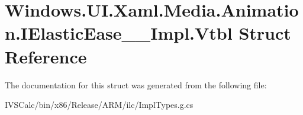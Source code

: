\hypertarget{struct_windows_1_1_u_i_1_1_xaml_1_1_media_1_1_animation_1_1_i_elastic_ease_____impl_1_1_vtbl}{}\section{Windows.\+U\+I.\+Xaml.\+Media.\+Animation.\+I\+Elastic\+Ease\+\_\+\+\_\+\+Impl.\+Vtbl Struct Reference}
\label{struct_windows_1_1_u_i_1_1_xaml_1_1_media_1_1_animation_1_1_i_elastic_ease_____impl_1_1_vtbl}


The documentation for this struct was generated from the following file\+:\begin{DoxyCompactItemize}
\item 
I\+V\+S\+Calc/bin/x86/\+Release/\+A\+R\+M/ilc/Impl\+Types.\+g.\+cs\end{DoxyCompactItemize}
